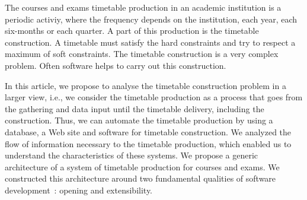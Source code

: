 The courses and exams timetable production in an academic
institution is a periodic activiy, where the frequency depends on
the institution, each year, each six-months or each quarter. A
part of this production is the timetable construction. A timetable
must satisfy the hard constraints and try to respect a maximum of
soft constraints. The timetable construction is a very complex
problem. Often software helps to carry out this construction.

In this article, we propose to analyse the timetable construction
problem in a larger view, i.e., we consider the timetable
production as a process that goes from the gathering and data
input until the timetable delivery, including the construction.
Thus, we can automate the timetable production by using a
database, a Web site and software for timetable construction. We
analyzed the flow of information necessary to the timetable
production, which enabled us to understand the characteristics of
these systems. We propose a generic architecture of a system of
timetable production for courses and exams. We constructed this
architecture around two fundamental qualities of software
development~: opening and extensibility.
